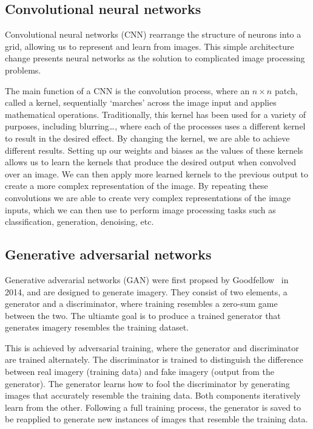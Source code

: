 \subsection{Convolutional neural networks}
Convolutional neural networks (CNN) rearrange the structure of neurons into a grid, allowing us to represent and learn from images. This simple architecture change presents neural networks as the solution to complicated image processing problems.

The main function of a CNN is the convolution process, where an $n \times n$ patch, called a kernel, sequentially `marches' across the image input and applies mathematical operations. Traditionally, this kernel has been used for a variety of purposes, including blurring\dots, where each of the processes uses a different kernel to result in the desired effect. By changing the kernel, we are able to achieve different results. Setting up our weights and biases as the values of these kernels allows us to learn the kernels that produce the desired output when convolved over an image. We can then apply more learned kernels to the previous output to create a more complex representation of the image. By repeating these convolutions we are able to create very complex representations of the image inputs, which we can then use to perform image processing tasks such as classification, generation, denoising, etc.

\subsection{Generative adversarial networks}
Generative adverarial networks (GAN) were first propsed by Goodfellow \etal \ in 2014, and are designed to generate imagery. They consist of two elements, a generator and a discriminator, where training resembles a zero-sum game~\cite{ref} between the two. The ultiamte goal is to produce a trained generator that generates imagery resembles the training dataset.

This is achieved by adversarial training, where the generator and discriminator are trained alternately. The discriminator is trained to distinguish the difference between real imagery (training data) and fake imagery (output from the generator). The generator learns how to fool the discriminator by generating images that accurately resemble the training data. Both components iteratively learn from the other. Following a full training process, the generator is saved to be reapplied to generate new instances of images that resemble the training data.

